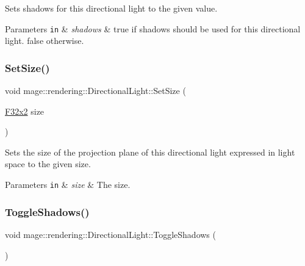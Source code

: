 Sets shadows for this directional light to the given value.


\begin{DoxyParams}[1]{Parameters}
\mbox{\tt in}  & {\em shadows} & {\ttfamily true} if shadows should be used for this directional light. {\ttfamily false} otherwise. \\
\hline
\end{DoxyParams}
\mbox{\label{classmage_1_1rendering_1_1_directional_light_aae69d3285b7980ad7215e1b517d0a8fd}} 
\subsubsection{\texorpdfstring{Set\+Size()}{SetSize()}}
{\footnotesize\ttfamily void mage\+::rendering\+::\+Directional\+Light\+::\+Set\+Size (\begin{DoxyParamCaption}\item[{\mbox{\hyperlink{namespacemage_a9dc0d34d6ecc87e4cfa4a826102117bc}{F32x2}}}]{size }\end{DoxyParamCaption})\hspace{0.3cm}{\ttfamily [noexcept]}}

Sets the size of the projection plane of this directional light expressed in light space to the given size.


\begin{DoxyParams}[1]{Parameters}
\mbox{\tt in}  & {\em size} & The size. \\
\hline
\end{DoxyParams}
\mbox{\label{classmage_1_1rendering_1_1_directional_light_a34a939e192e857ac25f6d91dd773ec9b}} 
\subsubsection{\texorpdfstring{Toggle\+Shadows()}{ToggleShadows()}}
{\footnotesize\ttfamily void mage\+::rendering\+::\+Directional\+Light\+::\+Toggle\+Shadows (\begin{DoxyParamCaption}{ }\end{DoxyParamCaption})\hspace{0.3cm}{\ttfamily [noexcept]}}

